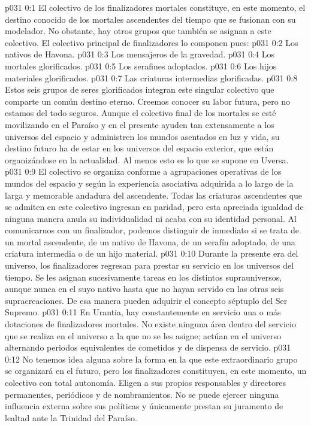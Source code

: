 \author{Consejero divino y un sin nombre ni número}
\vs p031 0:1 El colectivo de los finalizadores mortales constituye, en este momento, el destino conocido de los mortales ascendentes del tiempo que se fusionan con su modelador. No obstante, hay otros grupos que también se asignan a este colectivo. El colectivo principal de finalizadores lo componen pues:
\vs p031 0:2 Los nativos de Havona.
\vs p031 0:3 Los mensajeros de la gravedad.
\vs p031 0:4 Los mortales glorificados.
\vs p031 0:5 Los serafines adoptados.
\vs p031 0:6 Los hijos materiales glorificados.
\vs p031 0:7 Las criaturas intermedias glorificadas.
\vs p031 0:8 \pc Estos seis grupos de seres glorificados integran este singular colectivo que comparte un común destino eterno. Creemos conocer su labor futura, pero no estamos del todo seguros. Aunque el colectivo final de los mortales se esté movilizando en el Paraíso y en el presente ayuden tan extensamente a los universos del espacio y administren los mundos asentados en luz y vida, su destino futuro ha de estar en los universos del espacio exterior, que están organizándose en la actualidad. Al menos esto es lo que se supone en Uversa.
\vs p031 0:9 El colectivo se organiza conforme a agrupaciones operativas de los mundos del espacio y según la experiencia asociativa adquirida a lo largo de la larga y memorable andadura del ascendente. Todas las criaturas ascendentes que se admiten en este colectivo ingresan en paridad, pero esta apreciada igualdad de ninguna manera anula su individualidad ni acaba con su identidad personal. Al comunicarnos con un finalizador, podemos distinguir de inmediato si se trata de un mortal ascendente, de un nativo de Havona, de un serafín adoptado, de una criatura intermedia o de un hijo material.
\vs p031 0:10 Durante la presente era del universo, los finalizadores regresan para prestar su servicio en los universos del tiempo. Se les asignan sucesivamente tareas en los distintos suprauniversos, aunque nunca en el suyo nativo hasta que no hayan servido en las otras seis supracreaciones. De esa manera pueden adquirir el concepto séptuplo del Ser Supremo.
\vs p031 0:11 En Urantia, hay constantemente en servicio una o más dotaciones de finalizadores mortales. No existe ninguna área dentro del servicio que se realiza en el universo a la que no se les asigne; actúan en el universo alternando periodos equivalentes de cometidos y de dispensa de servicio.
\vs p031 0:12 No tenemos idea alguna sobre la forma en la que este extraordinario grupo se organizará en el futuro, pero los finalizadores constituyen, en este momento, un colectivo con total autonomía. Eligen a sus propios responsables y directores permanentes, periódicos y de nombramientos. No se puede ejercer ninguna influencia externa sobre sus políticas y únicamente prestan su juramento de lealtad ante la Trinidad del Paraíso.
